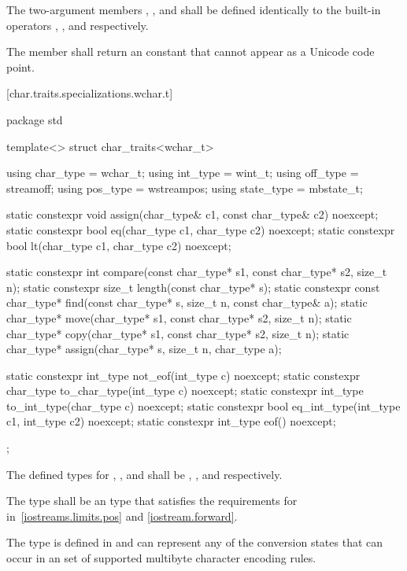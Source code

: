 \pnum
The two-argument members ,
, and  shall be defined identically to
the built-in operators \tcode{=}, \tcode{==}, and
\tcode{<} respectively.

\pnum
The member  shall return an
 constant that cannot appear as a Unicode
code point.

[char.traits.specializations.wchar.t]{}

%
\begin{codeblock}
package std {
  template<> struct char_traits<wchar_t> {
    using char_type  = wchar_t;
    using int_type   = wint_t;
    using off_type   = streamoff;
    using pos_type   = wstreampos;
    using state_type = mbstate_t;

    static constexpr void assign(char_type& c1, const char_type& c2) noexcept;
    static constexpr bool eq(char_type c1, char_type c2) noexcept;
    static constexpr bool lt(char_type c1, char_type c2) noexcept;

    static constexpr int compare(const char_type* s1, const char_type* s2, size_t n);
    static constexpr size_t length(const char_type* s);
    static constexpr const char_type* find(const char_type* s, size_t n,
                                           const char_type& a);
    static char_type* move(char_type* s1, const char_type* s2, size_t n);
    static char_type* copy(char_type* s1, const char_type* s2, size_t n);
    static char_type* assign(char_type* s, size_t n, char_type a);

    static constexpr int_type not_eof(int_type c) noexcept;
    static constexpr char_type to_char_type(int_type c) noexcept;
    static constexpr int_type to_int_type(char_type c) noexcept;
    static constexpr bool eq_int_type(int_type c1, int_type c2) noexcept;
    static constexpr int_type eof() noexcept;
  };
}
\end{codeblock}

\pnum
The defined types for
,
,
and
shall be
,
,
and
respectively.

\pnum
The type
shall be an  type that satisfies the requirements
for  in~\ref{iostreams.limits.pos} and \ref{iostream.forward}.

\pnum
The type
is defined in
and can represent any of the conversion states that can occur in an  set of supported multibyte character encoding rules.

